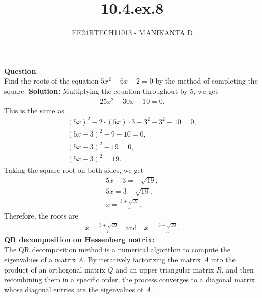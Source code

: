 \documentclass[journal]{IEEEtran}
\begin{document}

\vspace{3cm}

\title{10.4.ex.8}
\author{EE24BTECH11013 - MANIKANTA D}
{\let\newpage\relax\maketitle}

\renewcommand{\thefigure}{\theenumi}
\renewcommand{\thetable}{\theenumi}
\setlength{\intextsep}{10pt} %

\renewcommand{\thetable}{\theenumi}
\textbf{Question}:\\
Find the roots of the equation $5x^2 - 6x - 2 = 0$ by the method of completing the square.
\textbf{Solution:} Multiplying the equation throughout by $5$, we get
\begin{align}
25x^2 - 30x - 10 = 0.
\end{align}
This is the same as
\begin{align}
(5x)^2 - 2 \cdot (5x) \cdot 3 + 3^2 - 3^2 - 10 = 0, \\
(5x - 3)^2 - 9 - 10 = 0, \\
(5x - 3)^2 - 19 = 0, \\
(5x - 3)^2 = 19.
\end{align}
Taking the square root on both sides, we get
\begin{align}
5x - 3 = \pm \sqrt{19}, \\
5x = 3 \pm \sqrt{19}, \\
x = \frac{3 \pm \sqrt{19}}{5}.
\end{align}
Therefore, the roots are
\begin{align}
x = \frac{3 + \sqrt{19}}{5} \quad \text{and} \quad x = \frac{3 - \sqrt{19}}{5}.
\end{align}
\textbf{QR decomposition on Hessenberg matrix:}\\
The QR decomposition method is a numerical algorithm to compute the eigenvalues of a matrix $A$. By iteratively factorizing the matrix $A$ into the product of an orthogonal matrix $Q$ and an upper triangular matrix $R$, and then recombining them in a specific order, the process converges to a diagonal matrix whose diagonal entries are the eigenvalues of $A$.
\end{document}
